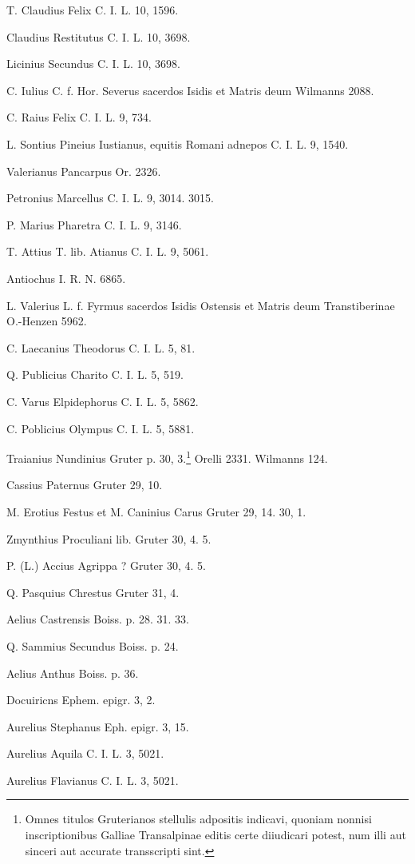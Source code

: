 \documentclass[a4paper, 11pt, oneside, polutonikogreek, german]{article}
\begin{document}
T. Claudius Felix C. I. L. 10, 1596.

Claudius Restitutus C. I. L. 10, 3698.

Licinius Secundus C. I. L. 10, 3698.

C. Iulius C. f. Hor. Severus sacerdos Isidis et Matris deum Wilmanns 2088.

C. Raius Felix C. I. L. 9, 734.

L. Sontius Pineius Iustianus, equitis Romani adnepos C. I. L. 9, 1540.

Valerianus Pancarpus Or. 2326.

Petronius Marcellus C. I. L. 9, 3014. 3015.

P. Marius Pharetra C. I. L. 9, 3146.

T. Attius T. lib. Atianus C. I. L. 9, 5061.

Antiochus I. R. N. 6865.

L. Valerius L. f. Fyrmus sacerdos Isidis Ostensis et Matris deum Transtiberinae O.-Henzen 5962.

C. Laecanius Theodorus C. I. L. 5, 81.

Q. Publicius Charito C. I. L. 5, 519.

C. Varus Elpidephorus C. I. L. 5, 5862.

C. Poblicius Olympus C. I. L. 5, 5881.

Traianius Nundinius Gruter p. 30, 3.\footnote{Omnes titulos Gruterianos stellulis adpositis indicavi, quoniam nonnisi inscriptionibus Galliae Transalpinae editis certe diiudicari potest, num illi aut sinceri aut accurate transscripti sint.} Orelli 2331. Wilmanns 124.

Cassius Paternus Gruter 29, 10.

M. Erotius Festus et M. Caninius Carus Gruter 29, 14. 30, 1.

Zmynthius Proculiani lib. Gruter 30, 4. 5.

P. (L.) Accius Agrippa ? Gruter 30, 4. 5.

Q. Pasquius Chrestus Gruter 31, 4.

Aelius Castrensis Boiss. p. 28. 31. 33.

Q. Sammius Secundus Boiss. p. 24.

Aelius Anthus Boiss. p. 36.

Docuiricns Ephem. epigr. 3, 2.

Aurelius Stephanus Eph. epigr. 3, 15.

Aurelius Aquila C. I. L. 3, 5021.

Aurelius Flavianus C. I. L. 3, 5021.
\end{document}
